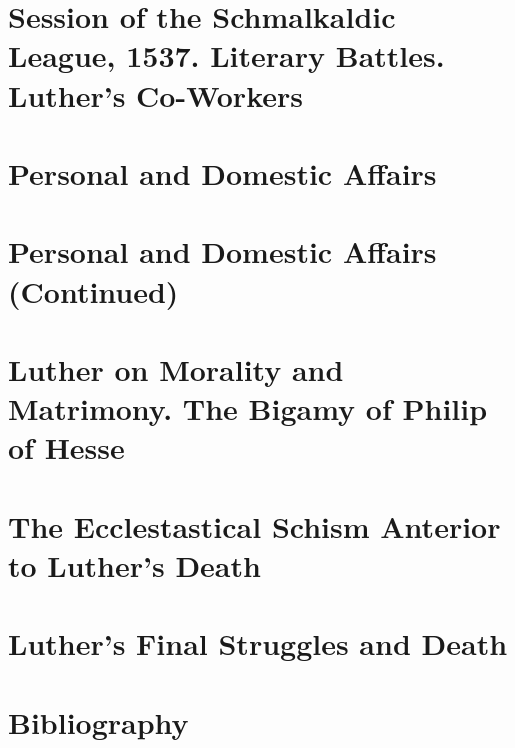 \chapter{Session of the Schmalkaldic League, 1537. Literary Battles. Luther’s Co-Workers}






\chapter{Personal and Domestic Affairs}



\chapter{Personal and Domestic Affairs (Continued)}



\chapter{Luther on Morality and Matrimony. The Bigamy of Philip of Hesse}




\chapter{The Ecclestastical Schism Anterior to Luther’s Death}



\chapter{Luther’s Final Struggles and Death}





\backmatter
\chapter{Bibliography}
\begin{hangparas}{1em}{1} %
	
\end{hangparas}
